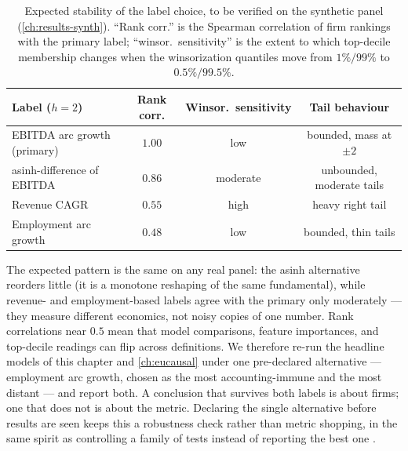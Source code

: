 \begin{table}[htbp]
\centering
\small
\setlength{\tabcolsep}{4pt}
\begin{tabular}{lccc}
\toprule
Label ($h=2$) & Rank corr. & Winsor.\ sensitivity & Tail behaviour \\
\midrule
EBITDA arc growth (primary) & $1.00$ & low      & bounded, mass at
$\pm 2$ \\
asinh-difference of EBITDA  & $0.86$ & moderate & unbounded, moderate
tails \\
Revenue CAGR                & $0.55$ & high     & heavy right tail \\
Employment arc growth       & $0.48$ & low      & bounded, thin tails \\
\bottomrule
\end{tabular}
\caption{Expected stability of the label choice, to be verified on the
synthetic panel (\cref{ch:results-synth}). ``Rank corr.'' is the
Spearman correlation of firm rankings with the primary label;
``winsor.\ sensitivity'' is the extent to which top-decile membership
changes when the winsorization quantiles move from $1\%/99\%$ to
$0.5\%/99.5\%$.}
\label{cheu:tab:robust}
\end{table}

The expected pattern is the same on any real panel: the asinh alternative reorders little (it
is a monotone reshaping of the same fundamental), while revenue- and employment-based labels
agree with the primary only moderately --- they measure different economics, not noisy copies
of one number. Rank correlations near $0.5$ mean that model comparisons, feature importances,
and top-decile readings can flip across definitions. We therefore re-run the headline models of
this chapter and \cref{ch:eucausal} under one pre-declared alternative --- employment arc
growth, chosen as the most accounting-immune and the most distant --- and report both. A
conclusion that survives both labels is about firms; one that does not is about the metric.
Declaring the single alternative before results are seen keeps this a robustness check rather
than metric shopping, in the same spirit as controlling a family of tests instead of reporting
the best one \citep{romano2019}.

